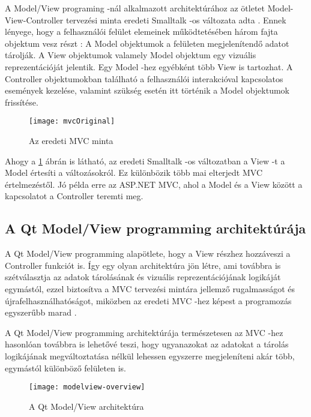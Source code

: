 A Model/View programing -nál alkalmazott architektúrához 
az ötletet Model-View-Controller tervezési minta 
eredeti Smalltalk -os változata adta \cite{qtmodelview}. 
Ennek lényege, hogy a felhasználói felület elemeinek működtetésében 
három fajta objektum vesz részt \cite{mvchistory}: \newline
A Model objektumok a felületen megjelenítendő adatot tárolják.\newline
A View objektumok valamely Model objektum egy vizuális reprezentációját jelentik. 
Egy Model -hez egyébként több View is tartozhat. \newline
A Controller objektumokban található 
a felhasználói interakcióval kapcsolatos események kezelése, 
valamint szükség esetén itt történik a Model objektumok frissítése.
\begin{figure}[h]
\centering
\texttt{[image: mvcOriginal]}
\caption{Az eredeti MVC minta \cite{mvcoriginal}}
\label{fig:x mvc}
\end{figure}

Ahogy a \ref{fig:x mvc} ábrán is látható, 
az eredeti Smalltalk -os változatban a View -t a Model értesíti a változásokról. 
Ez különbözik több mai elterjedt MVC értelmezéstől. 
Jó példa erre az ASP.NET MVC, 
ahol a Model és a View között a kapcsolatot a Controller teremti meg.

\subsection{A Qt Model/View programming architektúrája}

A Qt Model/View programming alapötlete, 
hogy a View részhez hozzáveszi a Controller funkciót is. 
Így egy olyan architektúra jön létre, ami továbbra is szétválasztja 
az adatok tárolásának és vizuális reprezentációjának logikáját egymástól, 
ezzel biztosítva a MVC tervezési mintára jellemző 
rugalmasságot és újrafelhasználhatóságot, 
miközben az eredeti MVC -hez képest 
a programozás egyszerűbb marad \cite{qtmodelview}.

A Qt Model/View programming architektúrája természetesen 
az MVC -hez hasonlóan továbbra is lehetővé teszi, 
hogy ugyanazokat az adatokat a tárolás logikájának megváltoztatása 
nélkül lehessen egyszerre megjeleníteni akár több,
egymástól különböző felületen is. 
\begin{figure}[h]
\centering
\texttt{[image: modelview-overview]}
\caption{A Qt Model/View architektúra \cite{mvprogramming}}
\label{fig:x QtModelView}
\end{figure}

